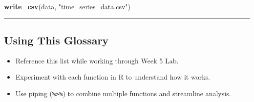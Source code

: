 \documentclass[
  11pt,
]{article}
\newenvironment{Shaded}{\begin{snugshade}}{\end{snugshade}}
\newcommand{\FunctionTok}[1]{\textcolor[rgb]{0.13,0.29,0.53}{\textbf{#1}}}
\newcommand{\NormalTok}[1]{#1}
\newcommand{\StringTok}[1]{\textcolor[rgb]{0.31,0.60,0.02}{#1}}
\providecommand{\tightlist}{%
  \setlength{\itemsep}{0pt}\setlength{\parskip}{0pt}}
\begin{document}
\begin{Shaded}
\begin{Highlighting}[]
\FunctionTok{write\_csv}\NormalTok{(data, }\StringTok{"time\_series\_data.csv"}\NormalTok{)}
\end{Highlighting}
\end{Shaded}

\begin{center}\rule{0.5\linewidth}{0.5pt}\end{center}

\subsection{\texorpdfstring{\textbf{Using This
Glossary}}{Using This Glossary}}\label{using-this-glossary}

\begin{itemize}
\tightlist
\item
  Reference this list while working through Week 5 Lab.
\item
  Experiment with each function in R to understand how it works.
\item
  Use piping (\texttt{\%\textgreater{}\%}) to combine multiple functions
  and streamline analysis.
\end{itemize}
\end{document}
